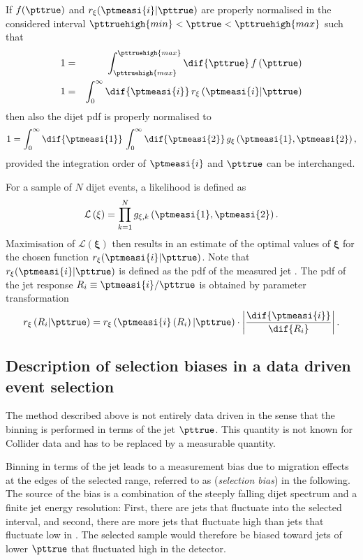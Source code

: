 If $f(\pttrue)$ and $r_{\mathbf{\xi}}(\ptmeasi{i}|\pttrue)$ are properly normalised in the considered interval \mbox{$\pttruehigh{min} < \pttrue < \pttruehigh{max}$} such that
\begin{eqnarray*}
  1 & = & \int^{\pttruehigh{max}}_{\pttruehigh{max}}\dif{\pttrue}\,f\left(\pttrue\right) \\
  1 & = & \int^{\infty}_{0}\dif{\ptmeasi{i}}\,r_{\mathbf{\xi}}\left(\ptmeasi{i}|\pttrue\right)
\end{eqnarray*}
then also the dijet pdf is properly normalised to
\begin{equation*}
  1 = \int^{\infty}_{0}\dif{\ptmeasi{1}}\,\int^{\infty}_{0}\dif{\ptmeasi{2}}\, g_{\mathbf{\xi}}\left(\ptmeasi{1},\ptmeasi{2}\right),
\end{equation*}
provided the integration order of $\ptmeasi{i}$ and $\pttrue$ can be interchanged.

For a sample of $N$ dijet events, a likelihood is defined as
\begin{equation}
  \label{eq:ResFit:Likelihood}
  \mathcal{L}\left(\mathbf{\xi}\right) = \prod^{N}_{k=1} g_{\mathbf{\xi},k}\left(\ptmeasi{1},\ptmeasi{2}\right).
\end{equation}
Maximisation of $\mathcal{L}(\mathbf{\xi})$ then results in an
estimate of the optimal values of $\mathbf{\xi}$ for the chosen
function $r_{\mathbf{\xi}}(\ptmeasi{i}|\pttrue)$.
Note that $r_{\mathbf{\xi}}(\ptmeasi{i}|\pttrue)$ is defined as the
pdf of the measured jet \pt.
The pdf of the jet \pt response \mbox{$R_{i}\equiv\ptmeasi{i} / \pttrue$} is obtained by parameter transformation
\begin{equation*}
  r_{\mathbf{\xi}}\left(R_{i}|\pttrue\right) =
  r_{\mathbf{\xi}}\left(\ptmeasi{i}\left(R_{i}\right)|\pttrue\right)\cdot\left|\frac{\dif{\ptmeasi{i}}}{\dif{R_{i}}}\right|.
\end{equation*}



\subsection{Description of selection biases in a data driven event selection}\label{sec:ResFit:Method:Biases}

The method described above is not entirely data driven in the sense that the binning is performed in terms
of the jet $\pttrue$.
This quantity is not known for Collider data and has to be replaced by a measurable quantity. 

Binning in terms of the jet \ptmeas leads to a measurement bias due to migration effects at the edges of 
the selected \pt range, referred to as (\textit{selection bias}) in the following.
The source of the bias is a combination of the steeply falling dijet \pt spectrum and a finite jet energy resolution:
First, there are jets that fluctuate into the selected \pt interval, and second, there are more jets that fluctuate high than jets that fluctuate low in \pt.
The selected sample would therefore be biased toward jets of lower $\pttrue$ that fluctuated high in the detector.

